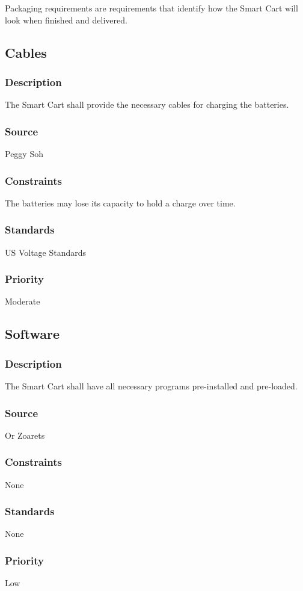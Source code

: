 Packaging requirements are requirements that identify how the Smart Cart will look when finished and delivered.

\subsection{Cables}
\subsubsection{Description}
The Smart Cart shall provide the necessary cables for charging the batteries.
\subsubsection{Source}
Peggy Soh
\subsubsection{Constraints}
The batteries may lose its capacity to hold a charge over time. 
\subsubsection{Standards}
US Voltage Standards
\subsubsection{Priority}
Moderate

\subsection{Software}
\subsubsection{Description}
The Smart Cart shall have all necessary programs pre-installed and pre-loaded.
\subsubsection{Source}
Or Zoarets
\subsubsection{Constraints}
None
\subsubsection{Standards}
None
\subsubsection{Priority}
Low

